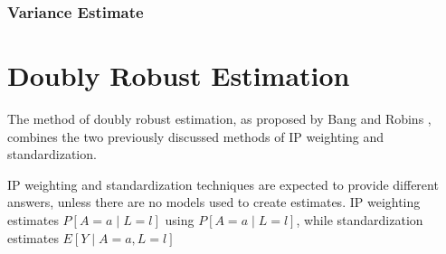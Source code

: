 \subsubsection{Variance Estimate} 


\section{Doubly Robust Estimation} 
The method of doubly robust estimation, as proposed by Bang and Robins \cite{bang2005doubly}, combines the two previously discussed methods of IP weighting and standardization.  

IP weighting and standardization techniques are expected to provide different answers, unless there are no models used to create estimates.\cite{hernan_robins_2016}  
IP weighting estimates $P[A=a \mid L =l]$ using $P[A =a \mid L= l]$, while standardization estimates $E[Y \mid A = a, L=l]$  
